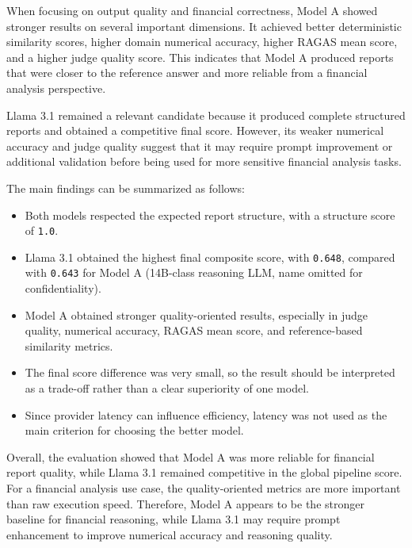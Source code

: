    When focusing on output quality and financial correctness, Model A showed stronger results on several important dimensions. It achieved better deterministic similarity scores, higher domain numerical accuracy, higher RAGAS mean score, and a higher judge quality score. This indicates that Model A produced reports that were closer to the reference answer and more reliable from a financial analysis perspective.

Llama 3.1 remained a relevant candidate because it produced complete structured reports and obtained a competitive final score. However, its weaker numerical accuracy and judge quality suggest that it may require prompt improvement or additional validation before being used for more sensitive financial analysis tasks.

The main findings can be summarized as follows:

\begin{itemize}
    \item Both models respected the expected report structure, with a structure score of \texttt{1.0}.
    
    \item Llama 3.1 obtained the highest final composite score, with \texttt{0.648}, compared with \texttt{0.643} for Model A (14B-class reasoning LLM, name omitted for confidentiality).
    
    \item Model A obtained stronger quality-oriented results, especially in judge quality, numerical accuracy, RAGAS mean score, and reference-based similarity metrics.
    
    \item The final score difference was very small, so the result should be interpreted as a trade-off rather than a clear superiority of one model.
    
    \item Since provider latency can influence efficiency, latency was not used as the main criterion for choosing the better model.
\end{itemize}

Overall, the evaluation showed that Model A was more reliable for financial report quality, while Llama 3.1 remained competitive in the global pipeline score. For a financial analysis use case, the quality-oriented metrics are more important than raw execution speed. Therefore, Model A appears to be the stronger baseline for financial reasoning, while Llama 3.1 may require prompt enhancement to improve numerical accuracy and reasoning quality.

